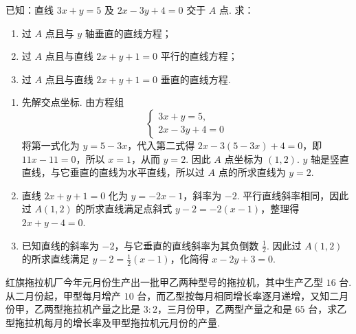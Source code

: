 \begin{problem}
已知：直线 \(3x+y=5\) 及 \(2x-3y+4=0\) 交于 \(A\) 点.
求：
\begin{enumerate}
\item 过 \(A\) 点且与 \(y\) 轴垂直的直线方程；
\item 过 \(A\) 点且与直线 \(2x+y+1=0\) 平行的直线方程；
\item 过 \(A\) 点且与直线 \(2x+y+1=0\) 垂直的直线方程.
\end{enumerate}
\end{problem}

\begin{solution}
\begin{enumerate}
\item 先解交点坐标. 由方程组
\[
\begin{cases}
3x+y=5,\\
2x-3y+4=0
\end{cases}
\]
将第一式化为 \(y=5-3x\)，代入第二式得 \(2x-3(5-3x)+4=0\)，即 \(11x-11=0\)，所以 \(x=1\)，从而 \(y=2\). 因此 \(A\) 点坐标为 \(\left(1,2\right)\). \(y\) 轴是竖直直线，与它垂直的直线为水平直线，所以过 \(A\) 点的所求直线为 \(y=2\).

\item 直线 \(2x+y+1=0\) 化为 \(y=-2x-1\)，斜率为 \(-2\). 平行直线斜率相同，因此过 \(A\left(1,2\right)\) 的所求直线满足点斜式
\(y-2=-2\left(x-1\right)\)，整理得 \(2x+y-4=0\).

\item 已知直线的斜率为 \(-2\)，与它垂直的直线斜率为其负倒数 \(\frac{1}{2}\). 因此过 \(A\left(1,2\right)\) 的所求直线满足
\(y-2=\frac{1}{2}\left(x-1\right)\)，化简得 \(x-2y+3=0\).
\end{enumerate}
\end{solution}

\begin{problem}
红旗拖拉机厂今年元月份生产出一批甲乙两种型号的拖拉机，其中生产乙型 \(16\text{ 台}\). 从二月份起，甲型每月增产 \(10\text{ 台}\)，而乙型按每月相同增长率逐月递增，又知二月份甲，乙两型拖拉机产量之比是 \(3:2\)，三月份甲，乙两型产量之和是 \(65\text{ 台}\)，求乙型拖拉机每月的增长率及甲型拖拉机元月份的产量.
\end{problem}

